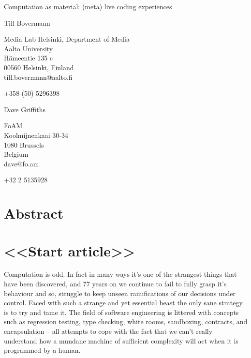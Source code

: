 \documentclass[letterpaper, 12pt]{article}
\begin{document}
{\cmjTitle 	Computation as material: (meta) live coding experiences}
\vspace*{24pt}


{\cmjAuthor Till Bovermann}
\newline
\begin{cmjAuthorAddress}
	Media Lab Helsinki, Department of Media\\
	Aalto University\\
	H\"ameentie 135 c\\
	00560 Helsinki, Finland\\
	till.bovermann@aalto.fi
\end{cmjAuthorAddress}

\vspace*{24pt}
{\cmjAuthorPhone +358 (50) 5296398}
\vspace*{24pt}

{\cmjAuthor Dave Griffiths}
\newline
\begin{cmjAuthorAddress}
	FoAM\\
	Koolmijnenkaai 30-34\\
	1080 Brussels\\
	Belgium\\
	dave@fo.am
\end{cmjAuthorAddress}

\vspace*{24pt}
{\cmjAuthorPhone +32 2 5135928}
\vspace*{24pt}


\section{Abstract}



\section{<<Start article>>}


Computation is odd. 
In fact in many ways it's one of the strangest things that have been discovered, and 77 years on we continue to fail to fully grasp it's behaviour and so, struggle to keep unseen ramifications of our decisions under control. Faced with such a strange and yet essential beast the only sane strategy is to try and tame it. 
The field of software engineering is littered with concepts such as regression testing, type checking, white rooms, sandboxing, contracts, and encapsulation -- all attempts to cope with the fact that we can't really understand how a mundane machine of sufficient complexity will act when it is programmed by a human.
\end{document}
